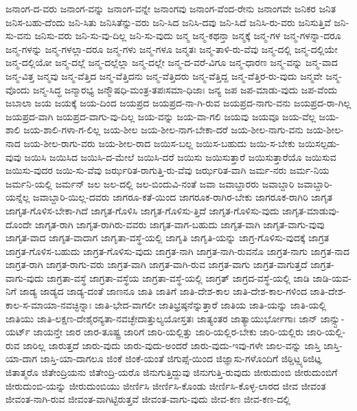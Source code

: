 {ಜನಾಂಗ-ದ-ವರು
ಜನಾಂಗ-ವನ್ನು
ಜನಾಂಗ-ವನ್ನೇ
ಜನಾಂಗವು
ಜನಾಂಗ-ವೆಂದ-ರೇನು
ಜನಾಂಗವೇ
ಜನಿಕರ
ಜನಿತ
ಜನಿಸ-ಬಹು-ದೆಂದು
ಜನಿ-ಸಿತು
ಜನಿಸಿತೆನ್ನು-ವರು
ಜನಿ-ಸಿದ
ಜನಿಸಿ-ದವು
ಜನಿ-ಸಿದೆ
ಜನಿಸಿ-ರು-ವರು
ಜನಿಸುತ್ತಿವೆ
ಜನಿ-ಸು-ವನು
ಜನಿಸು-ವರು
ಜನಿ-ಸು-ವು-ದಿಲ್ಲ
ಜನಿ-ಸು-ವುದು
ಜನ್ಮ
ಜನ್ಮ-ಕಥನ್ತಾ
ಜನ್ಮಕ್ಕೆ
ಜನ್ಮ-ಗಳ
ಜನ್ಮ-ಗಳನ್ನಾ-ದರೂ
ಜನ್ಮ-ಗಳನ್ನು
ಜನ್ಮ-ಗಳಲ್ಲಾ-ದರೂ
ಜನ್ಮ-ಗಳು
ಜನ್ಮ-ಗಳೂ
ಜನ್ಮತಃ
ಜನ್ಮ-ತಾಳಿ-ರು-ವೆವು
ಜನ್ಮ-ದಲ್ಲಿ
ಜನ್ಮ-ದಲ್ಲಿಯೇ
ಜನ್ಮ-ದಲ್ಲಿಯೋ
ಜನ್ಮ-ದಲ್ಲೆ
ಜನ್ಮ-ದಲ್ಲೆಲ್ಲಾ
ಜನ್ಮ-ದಲ್ಲೇ
ಜನ್ಮ-ದ-ವರೆ-ವಿಗೂ
ಜನ್ಮ-ಧಾರಣ
ಜನ್ಮ-ವನ್ನು
ಜನ್ಮ-ವಾದ
ಜನ್ಮ-ವಿತ್ತ
ಜನ್ಮವು
ಜನ್ಮ-ವೆತ್ತಿದ
ಜನ್ಮ-ವೆತ್ತಿದನು
ಜನ್ಮ-ವೆತ್ತಿದರು
ಜನ್ಮ-ವೆತ್ತಿದ್ದ
ಜನ್ಮ-ವೆತ್ತಿರ-ರು-ವುದು
ಜನ್ಮವೇ
ಜನ್ಮ-ವೊಂದು
ಜನ್ಮ-ಸಿದ್ಧ
ಜನ್ಮಾರಭ್ಯ
ಜನ್ಮೌಷಧಿ-ಮಂತ್ರ-ತಪಃಸಮಾ-ಧಿಜಾಃ
ಜನ್ಯ
ಜಪ
ಜಪ-ಮಾಡು-ವುದು
ಜಪ-ವೆಂದು
ಜಬಾಲಾ
ಜಯ
ಜಯಕ್ಕೆ
ಜಯ-ದಿಂದ
ಜಯಪ್ರದ
ಜಯಪ್ರದ-ನಾ-ಗಿ-ರುವ
ಜಯಪ್ರದ-ನಾಗು-ವನು
ಜಯಪ್ರದ-ರಾ-ಗಿಲ್ಲ
ಜಯಪ್ರದ-ವಾಗಿ
ಜಯಪ್ರದ-ವಾಗು-ವು-ದಿಲ್ಲ
ಜಯ-ವನ್ನು
ಜಯ-ವಾ-ಗಲಿ
ಜಯವು
ಜಯವೂ
ಜಯ-ವೆಲ್ಲ
ಜಯ-ಶಾಲಿ
ಜಯ-ಶಾಲಿ-ಗಳಾ-ಗ-ಲಿಲ್ಲ
ಜಯ-ಶೀಲ
ಜಯ-ಶೀಲ-ನಾಗ-ಬೇಕಾ-ದರೆ
ಜಯ-ಶೀಲ-ನಾಗು-ವನು
ಜಯ-ಶೀಲ-ನಾದ
ಜಯ-ಶೀಲ-ರಾಗು-ವರು
ಜಯ-ಶೀಲ-ರಾದ
ಜಯಿಸ-ಬಲ್ಲ
ಜಯಿಸ-ಬಹುದು
ಜಯಿ-ಸ-ಬೇಕು
ಜಯಿಸಲ್ಪಡು-ವುವು
ಜಯಿಸಿ
ಜಯಿಸಿದ
ಜಯಿಸಿ-ದ-ಮೇಲೆ
ಜಯಿಸಿ-ದರೆ
ಜಯಿಸು
ಜಯಿಸುತ್ತಾರೆ
ಜಯಿಸುತ್ತಾರೆಯೊ
ಜಯಿಸುವ
ಜಯಿಸು-ವುದರ
ಜಯಿ-ಸು-ವೆವು
ಜರ್ಝರಿತ-ರಾಗುತ್ತಿ-ರು-ವೆವು
ಜರ್ಝರಿತ-ವಾಗಿ
ಜರ್ಮ-ನರು
ಜರ್ಮ-ನಿಯ
ಜರ್ಮನಿ-ಯಲ್ಲಿ
ಜರ್ಮನ್
ಜಲ
ಜಲ-ದಲ್ಲಿ
ಜಲ-ಬಿಂದುವಿ-ನಂತೆ
ಜವಾ
ಜವಾಬ್ದಾರರು
ಜವಾಬ್ದಾರಿ
ಜವಾಬ್ದಾರಿ-ಯನ್ನೆಲ್ಲ
ಜವಾಬ್ದಾರಿ-ಯಿಲ್ಲ-ದವರು
ಜಾಗರೂ-ಕತೆ-ಯಿಂದ
ಜಾಗರೂಕ-ರಾಗಿರ-ಬೇಕು
ಜಾಗರೂಕ-ರಾಗಿರಿ
ಜಾಗೃತ
ಜಾಗೃತ-ಗೊಳಿಸ-ಬೇಕಾ-ಗಿದೆ
ಜಾಗೃತ-ಗೊಳಿಸಿ
ಜಾಗೃತ-ಗೊಳಿಸು-ತ್ತಿದೆ
ಜಾಗೃತ-ಗೊಳಿಸು-ವುದು
ಜಾಗೃತ-ಮಾಡುವು-ದೊಂದೇ
ಜಾಗೃತ-ರಾಗಿ
ಜಾಗೃತ-ರಾಗಿರು-ವವರು
ಜಾಗೃತ-ವಾಗ-ಬಹುದು
ಜಾಗೃತ-ವಾಗಿ
ಜಾಗೃತ-ವಾಗು-ವುವು
ಜಾಗೃತ-ವಾದ
ಜಾಗೃತ-ವಾದಾಗ
ಜಾಗೃತಾ-ವಸ್ಥೆ-ಯಲ್ಲಿ
ಜಾಗೃತಿ
ಜಾಗೃತಿ-ಯನ್ನು
ಜಾಗ್ರ-ಗೊಳಿಸು-ವುದಕ್ಕೆ
ಜಾಗ್ರತ
ಜಾಗ್ರತ-ಗೊಳಿಸ-ಬಹುದು
ಜಾಗ್ರತ-ಗೊಳಿಸು-ವುದು
ಜಾಗ್ರತ-ನಾಗಿ
ಜಾಗ್ರತ-ನಾಗಿ-ರುವನೊ
ಜಾಗ್ರತ-ನಾಗು
ಜಾಗ್ರತ-ನಾದ
ಜಾಗ್ರತ-ರಾಗಿ
ಜಾಗ್ರತ-ರಾಗು-ವರು
ಜಾಗ್ರತ-ವಾಗಿ
ಜಾಗ್ರತ-ವಾಗಿ-ರುವ
ಜಾಗ್ರತ-ವಾಗು
ಜಾಗ್ರತ-ವಾಗುತ್ತದೆ
ಜಾಗ್ರತ-ವಾಗು-ವುದು
ಜಾಗ್ರತಾ-ವಸ್ಥೆ
ಜಾಗ್ರತಾ-ವಸ್ಥೆಯ
ಜಾಗ್ರತಾ-ವಸ್ಥೆ-ಯಲ್ಲಿ
ಜಾಗ್ರತ್
ಜಾಗ್ರದ-ವಸ್ಥೆ-ಯಲ್ಲಿ
ಜಾಡಿ
ಜಾಡಿ-ಯವ-ನಿಗೆ
ಜಾಡ್ಯ
ಜಾಡ್ಯದ
ಜಾಡ್ಯ-ದಂತೆ
ಜಾಣನೂ
ಜಾತಿ
ಜಾತಿಗೆ
ಜಾತಿ-ದೇಶ-ಕಾಲ
ಜಾತಿ-ದೇಶ-ಕಾಲ-ಗಳಿಂದ
ಜಾತಿ-ದೇಶ-ಕಾಲ-ಸ-ಮಾಯಾ-ನವಚ್ಛಿನ್ನಾಃ
ಜಾತಿ-ಭೇದ-ವಾಗಲೀ
ಜಾತಿಭ್ರಷ್ಠನೆನ್ನುತ್ತಾರೆ
ಜಾತಿಯ
ಜಾತಿ-ಯನ್ನು
ಜಾತಿ-ಯಲ್ಲಿ
ಜಾತಿಯು
ಜಾತಿ-ಲಕ್ಷಣ-ದೇಶೈರನ್ಯತಾ-ನವಚ್ಛೇದಾತ್ತುಲ್ಯಯೋಸ್ತತಃ
ಜಾತ್ಯಂತರ
ಜಾತ್ಯಾಯುರ್ಭೋಗಾಃ
ಜಾನ್
ಜಾನ್ಸ್ಟು-ಯರ್ಟ್
ಜಾಯನ್ತೇ
ಜಾರ
ಜಾರ-ತೂಷ್ಟ್ರ
ಜಾರಿಗೆ
ಜಾರಿ-ಯಲ್ಲಿತ್ತು
ಜಾರಿ-ಯಲ್ಲಿರ-ಬೇಕು
ಜಾರಿ-ಯಲ್ಲಿರು
ಜಾರಿ-ಯಲ್ಲಿ-ರುವ
ಜಾರಿಲ್ಲ
ಜಾರುತ್ತದೆ
ಜಾರು-ವುದು
ಜಾರು-ವುದು-ಅಂದರೆ
ಜಾರು-ವುದು-ಇವು-ಗಳೇ
ಜಾಲ-ವನ್ನು
ಜಾಸ್ತಿ
ಜಾಸ್ತಿ-ಯಾ-ದಾಗ
ಜಾಸ್ತಿ-ಯಾ-ದಾಗಲೂ
ಜಿಂಕೆ
ಜಿಂಕೆ-ಯಂತೆ
ಜಿಗುಪ್ಸೆ-ಯಿಂದ
ಜಿಜ್ಞಾಸು-ಗಳೊಂದಿಗೆ
ಜಿಠ್ಡಿಟ್ಝ್ಠಠಿಜಿಟ್ಞ
ಜಿತಾತ್ಮರೊ
ಜಿತೇಂದ್ರಿಯನು
ಜಿತೇಂದ್ರಿ-ಯರೊ
ಜಿನುಗುತ್ತಿದ್ದುವು
ಜಿನುಗುತ್ತಿ-ರುವುದು
ಜೀರುದುಂಬಿ
ಜೀರುದುಂಬಿಗೆ
ಜೀರುದುಂಬಿ-ಯನ್ನು
ಜೀರುದುಂಬಿಯು
ಜೀರ್ಣಿಸಿ
ಜೀರ್ಣಿಸಿ-ಕೊಂಡು
ಜೀರ್ಣಿಸಿ-ಕೊಳ್ಳ-ಲಾರದ
ಜೀವ
ಜೀವಂತ
ಜೀವಂತ-ನಾಗಿ-ರುವ
ಜೀವಂತ-ವಾಗಿಟ್ಟಿರುತ್ತವೆ
ಜೀವಂತ-ವಾಗು-ವುದು
ಜೀವ-ಕಣ
ಜೀವ-ಕಣ-ದಲ್ಲಿ
}
